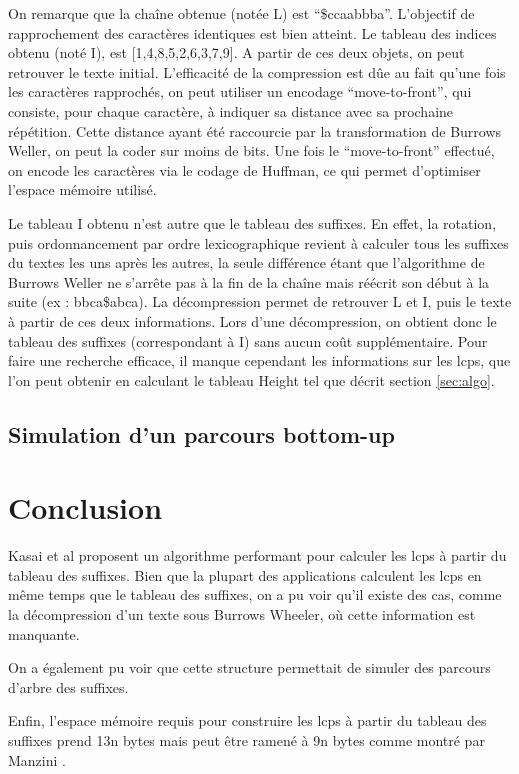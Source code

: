 \documentclass[a4paper,10pt]{article}
\begin{document}
On remarque que la chaîne obtenue (notée L) est
``\$ccaabbba''. L'objectif de rapprochement des caractères identiques
est bien atteint. Le tableau des indices obtenu (noté I), est
[1,4,8,5,2,6,3,7,9]. A partir de ces deux objets, on peut retrouver le
texte initial. L'efficacité de la compression est dûe au fait qu'une
fois les caractères rapprochés, on peut utiliser un encodage
``move-to-front'', qui consiste, pour chaque caractère, à indiquer sa
distance avec sa prochaine répétition. Cette distance ayant été
raccourcie par la transformation de Burrows Weller, on peut la coder
sur moins de bits. Une fois le ``move-to-front'' effectué, on encode
les caractères via le codage de Huffman, ce qui permet d'optimiser
l'espace mémoire utilisé.

Le tableau I obtenu n'est autre que le tableau des suffixes. En effet,
la rotation, puis ordonnancement par ordre lexicographique revient à
calculer tous les suffixes du textes les uns après les autres, la
seule différence étant que l'algorithme de Burrows Weller ne s'arrête
pas à la fin de la chaîne mais réécrit son début à la suite (ex :
bbca\$abca). La décompression permet de retrouver L et I, puis le
texte à partir de ces deux informations. Lors d'une décompression, on
obtient donc le tableau des suffixes (correspondant à I) sans aucun
coût supplémentaire. Pour faire une recherche efficace, il manque
cependant les informations sur les lcps, que l'on peut obtenir en
calculant le tableau Height tel que décrit section \ref{sec:algo}.


\subsection{Simulation d'un parcours bottom-up}
\label{sec:bottomup}


\section{Conclusion}
\label{sec:conclusion}


Kasai et al proposent un algorithme performant pour calculer les lcps
à partir du tableau des suffixes. Bien que la plupart des applications
calculent les lcps en même temps que le tableau des suffixes, on a pu
voir qu'il existe des cas, comme la décompression d'un texte sous
Burrows Wheeler, où cette information est manquante.

On a également pu voir que cette structure permettait de simuler des
parcours d'arbre des suffixes.

Enfin, l'espace mémoire requis pour construire les lcps à partir du
tableau des suffixes prend 13n bytes mais peut être ramené à 9n bytes
comme montré par Manzini \cite{Manzini04}.




\end{document}
